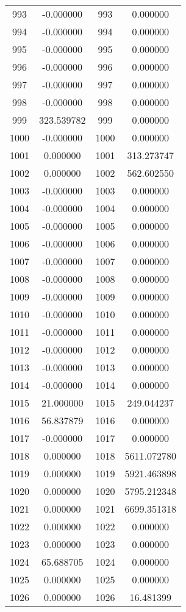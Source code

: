 \documentclass[12pt]{article}
\begin{document}
\begin{longtable}{@{}cccc@{}}
993 & -0.000000 & 993 & 0.000000 \\
994 & -0.000000 & 994 & 0.000000 \\
995 & -0.000000 & 995 & 0.000000 \\
996 & -0.000000 & 996 & 0.000000 \\
997 & -0.000000 & 997 & 0.000000 \\
998 & -0.000000 & 998 & 0.000000 \\
999 & 323.539782 & 999 & 0.000000 \\
1000 & -0.000000 & 1000 & 0.000000 \\
1001 & 0.000000 & 1001 & 313.273747 \\
1002 & 0.000000 & 1002 & 562.602550 \\
1003 & -0.000000 & 1003 & 0.000000 \\
1004 & -0.000000 & 1004 & 0.000000 \\
1005 & -0.000000 & 1005 & 0.000000 \\
1006 & -0.000000 & 1006 & 0.000000 \\
1007 & -0.000000 & 1007 & 0.000000 \\
1008 & -0.000000 & 1008 & 0.000000 \\
1009 & -0.000000 & 1009 & 0.000000 \\
1010 & -0.000000 & 1010 & 0.000000 \\
1011 & -0.000000 & 1011 & 0.000000 \\
1012 & -0.000000 & 1012 & 0.000000 \\
1013 & -0.000000 & 1013 & 0.000000 \\
1014 & -0.000000 & 1014 & 0.000000 \\
1015 & 21.000000 & 1015 & 249.044237 \\
1016 & 56.837879 & 1016 & 0.000000 \\
1017 & -0.000000 & 1017 & 0.000000 \\
1018 & 0.000000 & 1018 & 5611.072780 \\
1019 & 0.000000 & 1019 & 5921.463898 \\
1020 & 0.000000 & 1020 & 5795.212348 \\
1021 & 0.000000 & 1021 & 6699.351318 \\
1022 & 0.000000 & 1022 & 0.000000 \\
1023 & 0.000000 & 1023 & 0.000000 \\
1024 & 65.688705 & 1024 & 0.000000 \\
1025 & 0.000000 & 1025 & 0.000000 \\
1026 & 0.000000 & 1026 & 16.481399 \\

\end{longtable}
\end{document}
